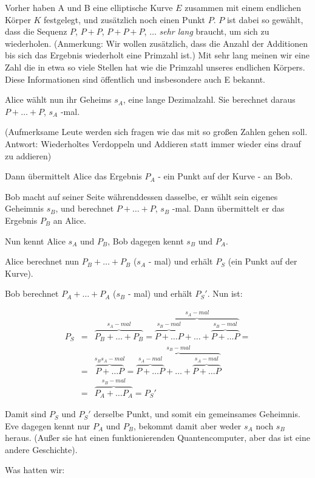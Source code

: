 \documentclass{article}
\begin{document}
Vorher haben A und B eine elliptische Kurve $E$ zusammen mit einem
endlichen Körper $K$ festgelegt, und zusätzlich noch einen Punkt $P$. $P$
ist dabei so gewählt, dass die Sequenz $P$, $P+P$, $P+P+P$, $\ldots$
\emph{sehr lang}
braucht, um sich zu wiederholen. (Anmerkung: Wir wollen zusätzlich, dass die
Anzahl der Additionen bis sich das Ergebnis wiederholt eine Primzahl ist.) Mit
sehr lang meinen wir eine Zahl die in etwa so viele Stellen hat wie die Primzahl
unseres endlichen Körpers. Diese Informationen sind öffentlich
und insbesondere auch E bekannt.

Alice wählt nun ihr Geheims $s_A$, eine lange Dezimalzahl. Sie berechnet
daraus $P + \ldots + P$, $s_A$ -mal.

(Aufmerksame Leute werden sich fragen wie das mit so großen Zahlen
gehen soll. Antwort: Wiederholtes Verdoppeln und Addieren statt immer wieder
eins drauf zu addieren)

Dann übermittelt Alice das Ergebnis $P_A$ - ein Punkt auf der Kurve - an
Bob.

Bob macht auf seiner Seite währenddessen dasselbe, er wählt sein
eigenes Geheimnis $s_B$, und berechnet $P + \ldots + P$, $s_B$ -mal. Dann
übermittelt er das Ergebnis $P_B$ an Alice.

Nun kennt Alice $s_A$ und $P_B$, Bob dagegen kennt $s_B$ und $P_A$.

Alice berechnet nun $P_B + \ldots + P_B$ ($s_A$ - mal) und erhält $P_S$ (ein
Punkt auf der Kurve).

Bob berechnet $P_A + \ldots + P_A$ ($s_B$ - mal) und erhält $P_S'$. Nun ist:

\begin{eqnarray*}
  P_S &=& \overbrace{P_B + \ldots + P_B}^{s_A-mal} =
  \overbrace{\overbrace{P + \ldots P}^{s_B-mal} + \ldots +
  \overbrace{P + \ldots P}^{s_B-mal}}^{s_A-mal} = \\
  &=& \overbrace{P + \ldots P}^{s_Bs_A-mal} =
  \overbrace{\overbrace{P + \ldots P}^{s_A-mal} + \ldots +
  \overbrace{P + \ldots P}^{s_A-mal}}^{s_B-mal} \\
  &=& \overbrace{P_A + \ldots P_A}^{s_B-mal} = P_S'
\end{eqnarray*}

Damit sind $P_S$ und $P_S'$ derselbe Punkt, und somit ein gemeinsames
Geheimnis. Eve dagegen kennt nur $P_A$ und $P_B$, bekommt damit aber weder
$s_A$ noch $s_B$ heraus. (Außer sie hat einen funktionierenden
Quantencomputer, aber das ist eine andere Geschichte).

Was hatten wir:
\end{document}
